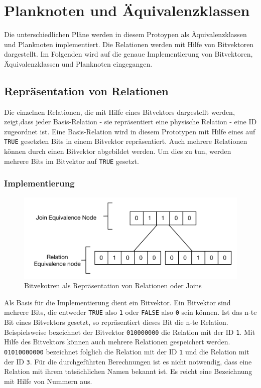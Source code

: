 \section{Planknoten und Äquivalenzklassen}

Die unterschiedlichen Pläne werden in diesem Protoypen als Äquivalenzklassen und Planknoten implementiert. Die Relationen werden mit Hilfe von Bitvektoren dargestellt. Im Folgenden wird auf die genaue Implementierung von Bitvektoren, Äquivalenzklassen und Planknoten eingegangen.

\subsection{Repräsentation von Relationen}
\label{sec:Bitvector}

Die einzelnen Relationen, die mit Hilfe eines Bitvektors dargestellt werden, zeigt,dass jeder Basis-Relation - sie repräsentiert eine physische Relation - eine ID zugeordnet ist. Eine Basis-Relation wird in diesem Prototypen mit Hilfe eines auf \texttt{TRUE} gesetzten Bits in einem Bitvektor repräsentiert. Auch mehrere Relationen können durch einen Bitvektor abgebildet werden. Um dies zu tun, werden mehrere Bits  im Bitvektor auf \texttt{TRUE} gesetzt.

\subsubsection{Implementierung}
\begin{figure}[ht]
  \centering
  \includegraphics[scale=0.75]{04_Implementierung/00_media/Bitvector.pdf}
  \caption{Bitvekotren als Repräsentation von Relationen oder Joins}
  \label{Bitvektor}
\end{figure}

Als Basis für die Implementierung dient ein Bitvektor. Ein Bitvektor sind mehrere Bits, die entweder \texttt{TRUE} also \texttt{1} oder \texttt{FALSE} also \texttt{0} sein können. Ist das n-te Bit eines Bitvektors gesetzt, so repräsentiert dieses Bit die n-te Relation. Beispielsweise bezeichnet der Bitvektor \texttt{010000000} die Relation mit der ID \texttt{1}. Mit Hilfe des Bitvektors können auch mehrere Relationen gespeichert werden. \texttt{01010000000} bezeichnet folglich die Relation mit der ID \texttt{1} und die Relation mit der ID \texttt{3}. Für die durchgeführten Berechnungen ist es nicht notwendig, dass eine Relation mit ihrem tatsächlichen Namen bekannt ist. Es reicht eine Bezeichnung mit Hilfe von Nummern aus.


